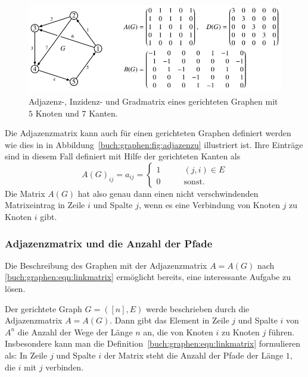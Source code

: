 \begin{figure}
\centering
\includegraphics{chapters/70-graphen/images/adjazenzd.pdf}
\caption{Adjazenz-, Inzidenz- und Gradmatrix eines gerichteten
Graphen mit $5$ Knoten und $7$ Kanten.
\label{buch:graphen:fig:adjazenzd}}
\end{figure}
Die Adjazenzmatrix kann auch für einen gerichteten Graphen definiert
werden wie dies in in Abbildung~\ref{buch:graphen:fig:adjazenzu}
illustriert ist.
Ihre Einträge sind in diesem Fall definiert mit Hilfe der 
gerichteten Kanten als
\begin{equation}
A(G)_{ij}
=
a_{ij}
=
\begin{cases}
1&\qquad  (j,i) \in E\\
0&\qquad  \text{sonst.}
\end{cases}
\label{buch:graphen:eqn:linkmatrix}
\end{equation}
Die Matrix $A(G)$ hat also genau dann einen nicht verschwindenden
Matrixeintrag in Zeile $i$ und Spalte $j$, wenn es eine Verbindung
von Knoten $j$ zu Knoten $i$ gibt.


\subsubsection{Adjazenzmatrix und die Anzahl der Pfade}
Die Beschreibung des Graphen mit der Adjazenzmatrix $A=A(G)$ nach
\eqref{buch:graphen:eqn:linkmatrix} ermöglicht bereits, eine interessante
Aufgabe zu lösen.

\begin{satz}
\label{buch:graphen:pfade-der-laenge-n}
Der gerichtete Graph $G=([n],E)$ werde beschrieben durch die Adjazenzmatrix
$A=A(G)$.
Dann gibt das Element in Zeile $j$ und Spalte $i$ von $A^n$ die Anzahl
der Wege der Länge $n$ an, die von Knoten $i$ zu Knoten $j$ führen.
Insbesondere kann man die Definition~\eqref{buch:graphen:eqn:linkmatrix}
formulieren als: In Zeile $j$ und Spalte $i$ der Matrix steht die Anzahl
der Pfade der Länge $1$, die $i$ mit $j$ verbinden.
\end{satz}

